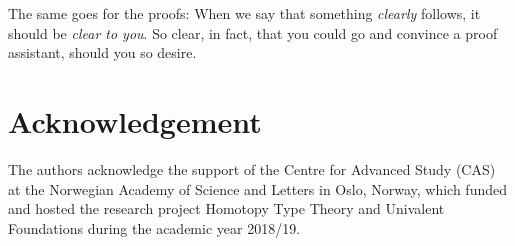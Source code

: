 The same goes for the proofs: When we say that something \emph{clearly} follows,
it should be \emph{clear to you}.
So clear, in fact, that you could go and convince a proof assistant,
should you so desire.

\section*{Acknowledgement}
The authors acknowledge the support of the Centre for Advanced Study (CAS)
at the Norwegian Academy of Science and Letters
in Oslo, Norway, which funded and hosted the research project Homotopy
Type Theory and Univalent Foundations during the academic year 2018/19.



